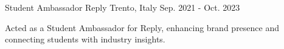 
\begin{cventries}

	\cventry
	{Student Ambassador} %
	{Reply} %
	{Trento, Italy} %
	{Sep. 2021 - Oct. 2023} %
	{
		\begin{cvitems} %
			\item Acted as a Student Ambassador for Reply, enhancing brand presence and connecting students with industry insights.
		\end{cvitems}
	}

\end{cventries}
